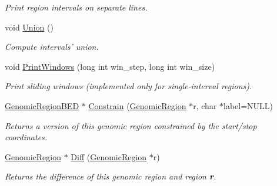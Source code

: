 \begin{CompactItemize}
\begin{CompactList}\small\item\em Print region intervals on separate lines. \item\end{CompactList}\item 
\hypertarget{classGenomicRegionBED_605f5bf86254547d117ed0c3f5c64587}{
void \hyperlink{classGenomicRegionBED_605f5bf86254547d117ed0c3f5c64587}{Union} ()}
\label{classGenomicRegionBED_605f5bf86254547d117ed0c3f5c64587}

\begin{CompactList}\small\item\em Compute intervals' union. \item\end{CompactList}\item 
\hypertarget{classGenomicRegionBED_3ebdc24dd97c7b106205d932970de535}{
void \hyperlink{classGenomicRegionBED_3ebdc24dd97c7b106205d932970de535}{PrintWindows} (long int win\_\-step, long int win\_\-size)}
\label{classGenomicRegionBED_3ebdc24dd97c7b106205d932970de535}

\begin{CompactList}\small\item\em Print sliding windows (implemented only for single-interval regions). \item\end{CompactList}\item 
\hypertarget{classGenomicRegionBED_0c4b2a8a590ce1dfbef142d03d53fe5d}{
\hyperlink{classGenomicRegionBED}{GenomicRegionBED} $\ast$ \hyperlink{classGenomicRegionBED_0c4b2a8a590ce1dfbef142d03d53fe5d}{Constrain} (\hyperlink{classGenomicRegion}{GenomicRegion} $\ast$r, char $\ast$label=NULL)}
\label{classGenomicRegionBED_0c4b2a8a590ce1dfbef142d03d53fe5d}

\begin{CompactList}\small\item\em Returns a version of this genomic region constrained by the start/stop coordinates. \item\end{CompactList}\item 
\hypertarget{classGenomicRegionBED_6db4aa9e6d1655bf116095d295b27269}{
\hyperlink{classGenomicRegion}{GenomicRegion} $\ast$ \hyperlink{classGenomicRegionBED_6db4aa9e6d1655bf116095d295b27269}{Diff} (\hyperlink{classGenomicRegion}{GenomicRegion} $\ast$r)}
\label{classGenomicRegionBED_6db4aa9e6d1655bf116095d295b27269}

\begin{CompactList}\small\item\em Returns the difference of this genomic region and region {\bf r}. \item\end{CompactList}\end{CompactItemize}
